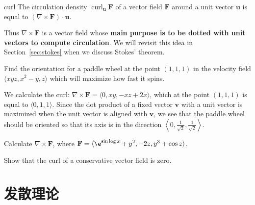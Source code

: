\documentclass[indent]{watsonbook}
\begin{document}
\begin{theo}{}{curl} \bang{-3mm} The circulation density $\operatorname{curl}_{\mathbf{u}}\mathbf{F}$ of a vector
  field $\mathbf{F}$ around a unit vector $\mathbf{u}$ is
  equal to $\left(\nabla \times \mathbf{F}\right) \cdot
  \mathbf{u}$.
\end{theo}

Thus $\nabla \times \mathbf{F}$ is a vector field whose \textbf{main purpose is to be dotted with unit vectors to compute circulation}. We will revisit this idea in Section~\ref{sec:stokes} when we discuss Stokes' theorem.

\begin{example}{}{}
  Find the orientation for a paddle wheel at the point $(1,1,1)$ in
  the velocity field $\langle xyz,x^2 - y, z \rangle$ which will
  maximize how fast it spins.
\end{example}

\begin{solution}
  We calculate the curl:
  $\nabla \times \mathbf{F} = \langle 0, xy, -xz + 2x \rangle$, which
  at the point $(1,1,1)$ is equal to $\langle 0,1,1 \rangle$. Since
  the dot product of a fixed vector $\mathbf{v}$ with a unit vector is
  maximized when the unit vector is aligned with $\mathbf{v}$, we see
  that the paddle wheel should be oriented so that its axis is in the
  direction
  $\boxed{\left\langle 0, \tfrac{1}{\sqrt{2}}, \tfrac{1}{\sqrt{2}} \right\rangle}$.
\end{solution}

\begin{exercise}{}{}
  Calculate $\nabla \times \mathbf{F}$, where $\mathbf{F} = \langle \e^{\sin \log x} + y^2,
  -2z, y^3 + \cos z \rangle$.
\end{exercise}

\begin{exercise}{}{}
  Show that the curl of a conservative vector field is zero.
\end{exercise}


\newpage

\section{发散理论} \label{sec:divtheorem}
\end{document}
